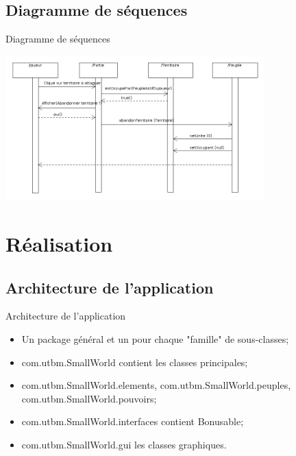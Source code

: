 \documentclass{beamer}
\begin{document}
	\subsection{Diagramme de séquences}

\begin{frame}{Diagramme de séquences}

\begin{center}
	\includegraphics[width=10cm]{DSSAbandon.png}
\end{center}

\end{frame}

	\section{Réalisation}
	
		\subsection{Architecture de l'application}
		
	
\begin{frame}{Architecture de l'application}

	\begin{itemize}
		\item Un package général et un pour chaque "famille" de sous-classes;
		\vspace*{0.2cm}
		\item com.utbm.SmallWorld contient les classes principales;
		\vspace*{0.2cm}
		\item com.utbm.SmallWorld.elements, com.utbm.SmallWorld.peuples, com.utbm.SmallWorld.pouvoirs;					\vspace*{0.2cm}
		\item com.utbm.SmallWorld.interfaces contient Bonusable;
		\vspace*{0.2cm}
		\item com.utbm.SmallWorld.gui les classes graphiques.
	\end{itemize}

\end{frame}
\end{document}
